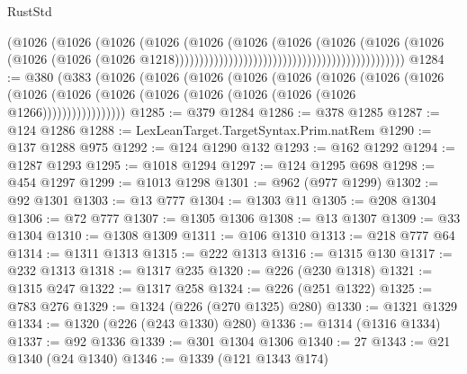 \begin{lexlean}{RustStd}
\begin{coremodule}
{\begin{coremodule}
{{{{{{{{{{{{{{{{{{{{{{{{{{{{{{{{{{{{{                                                                        (@1026
                                                                          (@1026
                                                                            (@1026
                                                                              (@1026
                                                                                (@1026
                                                                                  (@1026
                                                                                    (@1026
                                                                                      (@1026
                                                                                        (@1026
                                                                                          (@1026
                                                                                            (@1026
                                                                                              (@1026
                                                                                                (@1026
                                                                                                  @1218)))))))))))))))))))))))))))))))))))))))))))))))
@1284 := @380
    (@383
      (@1026
        (@1026
          (@1026
            (@1026
              (@1026
                (@1026
                  (@1026
                    (@1026
                      (@1026 (@1026 (@1026 (@1026 (@1026 (@1026 (@1026 (@1026 @1266)))))))))))))))))
@1285 := @379 @1284
@1286 := @378 @1285
@1287 := @124 @1286
@1288 := LexLeanTarget.TargetSyntax.Prim.natRem
@1290 := @137 @1288 @975
@1292 := @124 @1290 @132
@1293 := @162 @1292
@1294 := @1287 @1293
@1295 := @1018 @1294
@1297 := @124 @1295 @698
@1298 := @454 @1297
@1299 := @1013 @1298
@1301 := @962 (@977 @1299)
@1302 := @92 @1301
@1303 := @13 @777
@1304 := @1303 @11
@1305 := @208 @1304
@1306 := @72 @777
@1307 := @1305 @1306
@1308 := @13 @1307
@1309 := @33 @1304
@1310 := @1308 @1309
@1311 := @106 @1310
@1313 := @218 @777 @64
@1314 := @1311 @1313
@1315 := @222 @1313
@1316 := @1315 @130
@1317 := @232 @1313
@1318 := @1317 @235
@1320 := @226 (@230 @1318)
@1321 := @1315 @247
@1322 := @1317 @258
@1324 := @226 (@251 @1322)
@1325 := @783 @276
@1329 := @1324 (@226 (@270 @1325) @280)
@1330 := @1321 @1329
@1334 := @1320 (@226 (@243 @1330) @280)
@1336 := @1314 (@1316 @1334)
@1337 := @92 @1336
@1339 := @301 @1304 @1306
@1340 := 27
@1343 := @21 @1340 (@24 @1340)
@1346 := @1339 (@121 @1343 @174)
}}}}}}}}}}}}}}}}}}}}}}}}}}}}}}}}}}}}}
\end{coremodule}}
\end{coremodule}
\end{lexlean}
